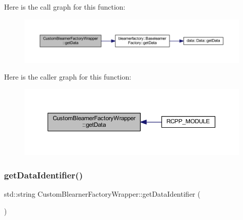 Here is the call graph for this function\+:\nopagebreak
\begin{figure}[H]
\begin{center}
\leavevmode
\includegraphics[width=350pt]{class_custom_blearner_factory_wrapper_a70a976e3608e37e0740df932b227de60_cgraph}
\end{center}
\end{figure}
Here is the caller graph for this function\+:\nopagebreak
\begin{figure}[H]
\begin{center}
\leavevmode
\includegraphics[width=350pt]{class_custom_blearner_factory_wrapper_a70a976e3608e37e0740df932b227de60_icgraph}
\end{center}
\end{figure}
\mbox{\label{class_custom_blearner_factory_wrapper_a67eba4cecf4cbde07ce5dca73a909f0f}} 
\subsubsection{\texorpdfstring{get\+Data\+Identifier()}{getDataIdentifier()}}
{\footnotesize\ttfamily std\+::string Custom\+Blearner\+Factory\+Wrapper\+::get\+Data\+Identifier (\begin{DoxyParamCaption}{ }\end{DoxyParamCaption})\hspace{0.3cm}{\ttfamily [inline]}}


